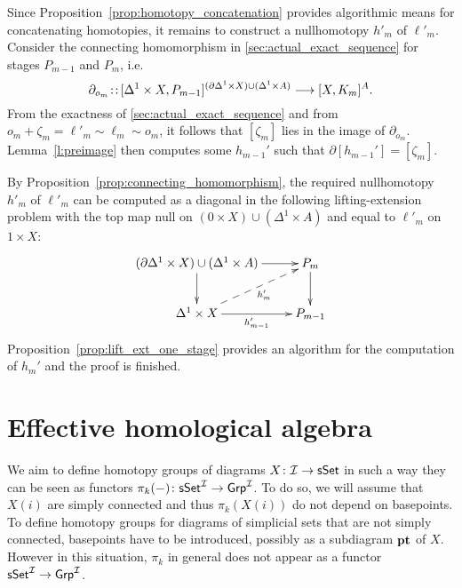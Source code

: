 \documentclass[12pt,a4wide]{article}
\theoremstyle{plain}
\theoremstyle{definition}
\newcommand{\pt}{ \mathrm{\bf pt}}
\newcommand{\heading}[1]{\vspace{1ex}\par\noindent{\bf\boldmath #1}}
\newcommand{\Grp}{\mathsf{Grp}}
\newcommand{\Pm}{P_{m}}
\newcommand{\Pmmo}{P_{m-1}}
\newcommand{\Lm}{{K_m}}
\newcommand{\them}{m}
\newcommand{\thedimm}{{k}}
\newcommand{\stdsimp}[1]{\Delta^{#1}}
\renewcommand\:{\colon}
\newcommand{\dX}{X}
\newcommand{\dpi}{\pi}
\newcommand{\icat}{\mathcal I}
\begin{document}
Since Proposition~\ref{prop:homotopy_concatenation} provides algorithmic means for concatenating homotopies, it remains to construct a nullhomotopy $h'_\them$ of $\ell'_\them$. Consider the connecting homomorphism in \ref{sec:actual_exact_sequence} for stages $\Pmmo$ and $\Pm$, i.e.
\[\partial_{o_\them}\col[\stdsimp{1}\times X,\Pmmo]^{(\partial\stdsimp{1}\times X)\cup(\stdsimp{1}\times A)}\lra[X,\Lm]^A.\]
From the exactness of \ref{sec:actual_exact_sequence} and from $o_\them + \zeta_\them = \ell'_\them\sim\ell_\them\sim o_\them$, it follows that $[\zeta_\them]$ lies in the image of $\partial_{o_\them}$. Lemma~\ref{l:preimage} then computes some $h_{\them-1}'$ such that $\partial[h_{\them-1}']=[\zeta_\them]$.

By Proposition~\ref{prop:connecting_homomorphism}, the required nullhomotopy $h'_\them$ of $\ell'_\them$ can be computed as a diagonal in the following lifting-extension problem with the top map null on $(0\times X)\cup(\stdsimp{1}\times A)$ and equal to $\ell'_\them$ on $1\times X$:
\[\xymatrix{
(\partial\stdsimp{1}\times X)\cup(\stdsimp{1}\times A) \ar[r] \ar[d] & \Pm \ar[d] \\
\stdsimp{1}\times X \ar[r]_-{h_{\them-1}'} \ar@{-->}[ru]_-{h'_\them} & \Pmmo
}\]
Proposition~\ref{prop:lift_ext_one_stage} provides an algorithm for the computation of $h_\them'$ and the proof is finished.


\section{Effective homological algebra}\label{sec:effective}


\heading{Homotopy and homology}




We aim to define homotopy groups of diagrams $\dX \: \icat \to \sSet$ in such a way they can be seen as functors $\dpi_\thedimm (-)\:\sSet^\icat \to \Grp^\icat$. To do so, we will assume that $\dX(i)$ are simply connected and thus  $\pi_\thedimm (\dX(i))$ do not depend on  basepoints.
To define homotopy groups for diagrams of simplicial sets that are not simply connected, basepoints have to be introduced, possibly as a subdiagram  $\pt$ of $\dX$. However in this situation, $\dpi_k$  in general does not appear as a  functor $\sSet^\icat \to \Grp^\icat$. 
\end{document}
